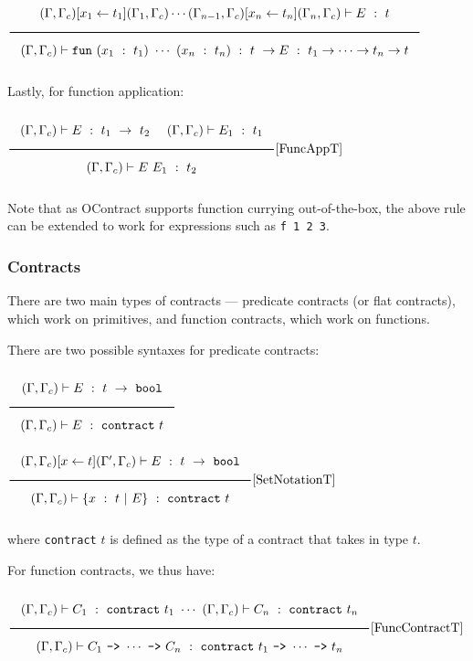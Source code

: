 \documentclass[a4paper]{article}
\newcommand{\Rule}[2]{\genfrac{}{}{0.7pt}{}{{\setlength{\fboxrule}{0pt}\setlength{\fboxsep}{3mm}\fbox{$#1$}}}{{\setlength{\fboxrule}{0pt}\setlength{\fboxsep}{3mm}\fbox{$#2$}}}}
\newcommand{\RuleWithName}[3]{\genfrac{}{}{0.7pt}{}{{\setlength{\fboxrule}{0pt}\setlength{\fboxsep}{3mm}\fbox{$#1$}}}{{\setlength{\fboxrule}{0pt}\setlength{\fboxsep}{3mm}\fbox{$#2$}}}[\text{#3}]}
\begin{document}
\begin{center}
    $\Rule{(\Gamma, \Gamma_c) [x_1 \leftarrow t_1](\Gamma_1, \Gamma_c) \cdots (\Gamma_{n-1}, \Gamma_c)[x_n \leftarrow t_n](\Gamma_n, \Gamma_c) \vdash E\ :\ t}
        {(\Gamma, \Gamma_c) \vdash \texttt{fun}\ (x_1\ :\ t_1)\ \cdots\ (x_n\ :\ t_n)\ :\ t\ \rightarrow E\ :\ t_1 \rightarrow \cdots \rightarrow t_n \rightarrow t}$
\end{center}

Lastly, for function application:

\begin{center}
    $\RuleWithName{(\Gamma, \Gamma_c) \vdash E\ :\ t_1\ \rightarrow\  t_2\ \quad (\Gamma, \Gamma_c) \vdash E_1\ :\ t_1}{(\Gamma, \Gamma_c) \vdash E\ E_1\ :\ t_2}{FuncAppT}$
\end{center}

Note that as OContract supports function currying out-of-the-box, the above rule can be extended to work for expressions such as \verb|f 1 2 3|.

\subsubsection{Contracts}

There are two main types of contracts --- predicate contracts (or flat contracts), which work on primitives, and function contracts, which work on functions.

There are two possible syntaxes for predicate contracts:

$\Rule{(\Gamma, \Gamma_c) \vdash E\ :\ t\ \rightarrow\ \texttt{bool}}{(\Gamma, \Gamma_c) \vdash E\ :\ \texttt{contract}\ t}$
\hfill
$\RuleWithName{(\Gamma, \Gamma_c) [x \leftarrow t] (\Gamma', \Gamma_c) \vdash E\ :\ t\ \rightarrow\ \texttt{bool}}{(\Gamma, \Gamma_c) \vdash \{x\ :\ t\ |\ E\}\ :\ \texttt{contract}\ t}{SetNotationT}$

where \verb|contract| $t$ is defined as the type of a contract that takes in type $t$.

For function contracts, we thus have:

\begin{center}
    $\RuleWithName{(\Gamma, \Gamma_c) \vdash C_1\ :\ \texttt{contract}\ t_1\ \cdots\ (\Gamma, \Gamma_c) \vdash C_n\ :\ \texttt{contract}\ t_n}{(\Gamma, \Gamma_c) \vdash C_1\ \texttt{->}\ \cdots\ \texttt{->}\ C_n\ :\ \texttt{contract}\ t_1\ \texttt{->}\ \cdots\ \texttt{->}\ t_n}{FuncContractT}$
\end{center}
\end{document}
